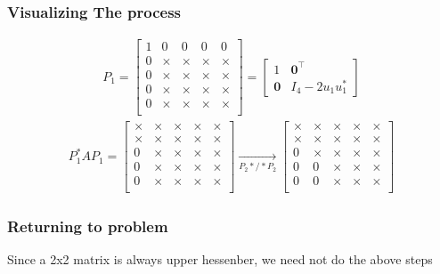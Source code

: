 \documentclass{beamer}
\theoremstyle{remark}
\numberwithin{equation}{section}
\begin{document}
\begin{frame}
\frametitle{Visualizing The process}
\begin{align}  
    P_1 = \begin{bmatrix}
        1 & 0 & 0 & 0 & 0 \\
        0 & \times & \times& \times& \times\\
        0 & \times & \times& \times& \times\\
        0 & \times & \times& \times& \times\\
        0 & \times & \times& \times& \times\\
    \end{bmatrix} = \begin{bmatrix}
        1 & \textbf{0}^{\top}\\
        \textbf{0} & I_4 - 2u_1u_1^*
    \end{bmatrix}    
\end{align}
\begin{multline}
    P_1^*AP_1 = \begin{bmatrix}
        \times & \times & \times& \times& \times\\
        \times & \times & \times& \times& \times\\
        0 & \times & \times& \times& \times\\
        0 & \times & \times& \times& \times\\
        0 & \times & \times& \times& \times\\
    \end{bmatrix} \xrightarrow[P_2*/*P_2]{} \begin{bmatrix}
        \times & \times & \times& \times& \times\\
        \times & \times & \times& \times& \times\\
        0 & \times & \times& \times& \times\\
        0 & 0 & \times& \times& \times\\
        0 & 0 & \times& \times& \times\\
    \end{bmatrix} 
    \end{multline}

\end{frame}
\begin{frame}
\frametitle{Returning to problem}
Since a 2x2 matrix is always upper hessenber, we need not do the above steps
\end{frame}
\end{document}
